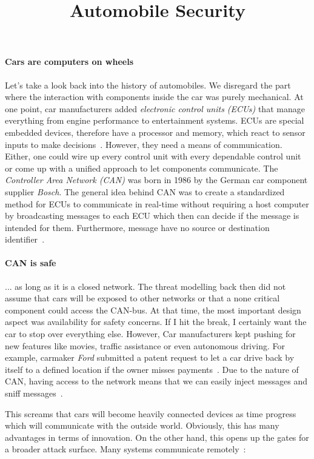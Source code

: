 \documentclass{homework}
\title{Automobile Security}
\begin{document}
 \maketitle

\paragraph{\textbf{Cars are computers on wheels}}
Let's take a look back into the history of automobiles. We disregard the part where
the interaction with components inside the car was purely mechanical. At one point, car manufacturers
added \emph{electronic control units (ECUs)} that manage everything from engine performance to entertainment systems.
ECUs are special embedded devices, therefore have a processor and memory, which react to sensor inputs to make decisions~\cite{carhackingbasics}.
However, they need a means of communication. Either, one could wire up every control unit with every dependable control unit
or come up with a unified approach to let components communicate. The \emph{Controller Area Network (CAN)} was born in 1986
by the German car component supplier \emph{Bosch}. The general idea behind CAN was to create a standardized method for
ECUs to communicate in real-time without requiring a host computer by broadcasting messages
to each ECU which then can decide if the message is intended for them. Furthermore, message have no source 
or destination identifier~\cite{carhackingbasics}. 

\paragraph{\textbf{CAN is safe}} ... as long as it is a closed network. The threat modelling back then did not assume
that cars will be exposed to other networks or that a none critical component could access the CAN-bus.
At that time, the most important design aspect was availability for safety concerns. If
I hit the break, I certainly want the car to stop over everything else. However, Car manufacturers kept pushing for new features like movies,
traffic assistance or even autonomous driving. For example, carmaker \emph{Ford} submitted a patent request to let a car drive back 
by itself to a defined location if the owner misses payments~\cite{ford}. Due to the nature of CAN, having access to the network 
means that we can easily inject messages and sniff messages~\cite{carhackingbasics}.

This screams that cars will become heavily connected devices as time progress which will communicate with the outside world. Obviously,
this has many advantages in terms of innovation. On the other hand, this opens up the gates for a broader attack surface. Many systems 
communicate remotely~\cite{carhackingsurface}:
\end{document}
